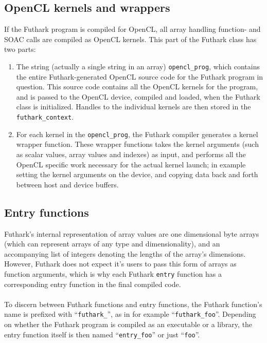\subsection*{OpenCL kernels and wrappers}
  If the Futhark program is compiled for OpenCL, all array handling function- and
  SOAC calls are compiled as OpenCL kernels. This part of the Futhark class
  has two parts:
  \begin{enumerate}
  \item The string (actually a single string in an array) \texttt{opencl\_prog}, which contains the entire
  Futhark-generated OpenCL source code for the Futhark program in question.
  This source code contains all the OpenCL kernels for the program, and is
  passed to the OpenCL device, compiled and loaded, when the Futhark class is
  initialized. Handles to the individual kernels are then stored in the \texttt{futhark\_context}.

  \item For each kernel in the \texttt{opencl\_prog}, the Futhark compiler
    generates a kernel wrapper function. These wrapper functions takes the
    kernel arguments (such as scalar values, array values and indexes) as input,
    and performs all the OpenCL specific work necessary for the actual kernel
    launch; in example setting the kernel arguments on the device, and copying
    data back and forth between host and device buffers.
  \end{enumerate}

\subsection*{Entry functions}
Futhark's internal representation of array values are one dimensional byte
arrays (which can represent arrays of any type and dimensionality), and an
accompanying list of integers denoting the lengths of the array's dimensions.
However, Futhark does not expect it's users to pass this form of arrays as
function arguments, which is why each Futhark \texttt{entry} function has a
corresponding entry function in the final compiled code.
\\\\
To discern between Futhark functions and entry functions, the Futhark function's
name is prefixed with ``\texttt{futhark\_}'', as in for example
``\texttt{futhark\_foo}''.
Depending on whether the Futhark program is compiled as an executable or a
library, the entry function itself is then named ``\texttt{entry\_foo}'' or
just ``\texttt{foo}''.

